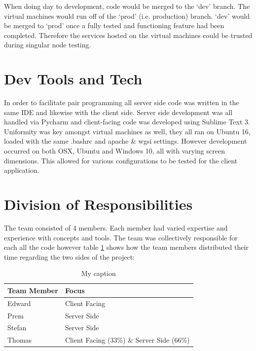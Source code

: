 When doing day to development, code would be merged to the `dev' branch. The virtual machines would run off of the `prod' (i.e. production) branch. `dev' would be merged to `prod' once a fully tested and functioning feature had been completed. Therefore the services hosted on the virtual machines could be trusted during singular node testing. 






\section{Dev Tools and Tech}
In order to facilitate pair programming all server side code was written in the same IDE and likewise with the client side. Server side development was all handled via Pycharm and client-facing code was developed using Sublime Text 3. Uniformity was key amongst virtual machines as well, they all ran on Ubuntu 16, loaded with the same .bashrc and apache \& wgsi settings. However development occurred on both OSX, Ubuntu and Windows 10, all with varying screen dimensions. This allowed for various configurations to be tested for the client application.


\section{Division of Responsibilities}
The team consisted of 4 members. Each member had varied expertise and experience with concepts and tools. The team was collectively responsible for each all the code however table \ref{table:focus} shows how the team members distributed their time regarding the two sides of the project:

\begin{table}[H]
\centering
\caption{My caption}
\label{table:focus}
\begin{tabular}{@{}ll@{}}
\toprule
Team Member & Focus                                   \\ \midrule
Edward      & Client Facing                           \\
Prem        & Server Side                             \\
Stefan      & Server Side                             \\
Thomas      & Client Facing (33\%) \& Server Side (66\%) \\ \bottomrule
\end{tabular}
\end{table}

